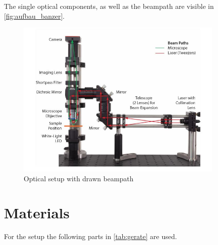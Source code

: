 \documentclass[12pt,english,ngerman]{scrartcl}
\begin{document}
The single optical components, as well as the beampath are visible in
\autoref{fig:aufbau_banzer}.
\begin{figure}[H]
	\begin{center}
		\includegraphics[width =0.9\textwidth]{./figures/aufbau_banzer.JPG}
	\end{center}
	\caption[Optical setup] { Optical setup with drawn beampath
	}\label{fig:aufbau_banzer}%
\end{figure}

\section{Materials}\label{sec:geraeteliste}

For the setup the following parts in \autoref{tab:gerate} are used.
\end{document}
